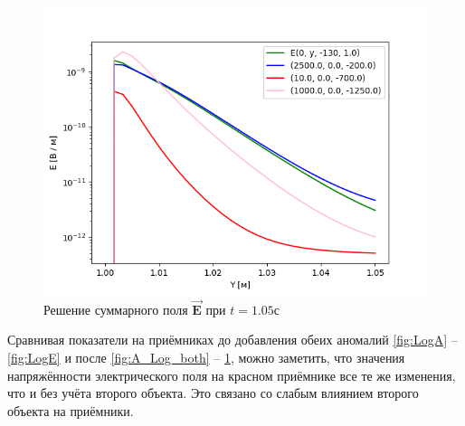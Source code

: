 \begin{figure}
	\centering
	\includegraphics[width=0.8\linewidth]{images/Log_E_both.png}
	\caption{Решение суммарного поля $\overrightarrow{\textbf{E}}$ при $t = 1.05с$}
	\label{fig:E_Log_both}
\end{figure} 

Сравнивая показатели на приёмниках до добавления обеих аномалий \ref{fig:LogA} -- \ref{fig:LogE} и после \ref{fig:A_Log_both} -- \ref{fig:E_Log_both}, можно заметить, что значения напряжённости электрического поля на красном приёмнике все те же изменения, что и без учёта второго объекта. Это связано со слабым влиянием второго объекта на приёмники. 